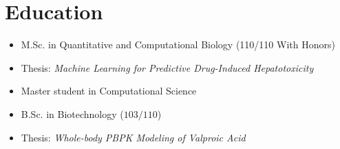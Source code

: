 \section{Education}

\begin{itemize}
  \item M.Sc. in Quantitative and Computational Biology (110/110 With Honors)
  \item Thesis: \textit{Machine Learning for Predictive Drug-Induced Hepatotoxicity}
\end{itemize}


\begin{itemize}
  \item Master student in Computational Science
\end{itemize}


\begin{itemize}
  \item B.Sc. in Biotechnology ($103/110$)
  \item Thesis: \textit{Whole-body PBPK Modeling of Valproic Acid}
\end{itemize}
